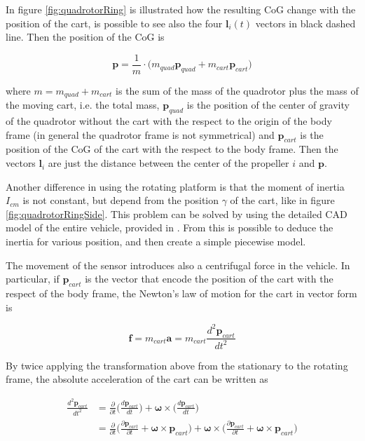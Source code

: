 \noindent In figure \ref{fig:quadrotorRing} is illustrated how the resulting CoG change with the position of the cart, is possible to see also the four $\mathbf{l}_i(t)$ vectors in black dashed line. Then the position of the CoG is

\begin{equation}
	\mathbf{p} = \frac{1}{m}\cdot \bigl(m_{quad}\mathbf{p}_{quad} + m_{cart}\mathbf{p}_{cart}\bigl)	
	\label{eq:CoG}
\end{equation}

\noindent where $m=m_{quad}+m_{cart}$ is the sum of the mass of the quadrotor plus the mass of the moving cart, i.e. the total mass, $\mathbf{p}_{quad}$ is the position of the center of gravity of the quadrotor without the cart with the respect to the origin of the body frame (in general the quadrotor frame is not symmetrical) and $\mathbf{p}_{cart}$ is the position of the CoG of the cart with the respect to the body frame. Then the vectors $\mathbf{l}_i$ are just the distance between the center of the propeller $i$ and $\mathbf{p}$.

\noindent Another difference in using the rotating platform is that the moment of inertia $I_{cm}$ is not constant, but depend from the position $\gamma$ of the cart, like in figure \ref{fig:quadrotorRingSide}. This problem can be solved by using the detailed CAD model of the entire vehicle, provided in \cite{Carlos}. From this is possible to deduce the inertia for various position, and then create a simple piecewise model. 

\noindent The movement of the sensor introduces also a centrifugal force in the vehicle. In particular, if $\mathbf{p}_{cart}$ is the vector that encode the position of the cart with the respect of the body frame, the Newton's law of motion for the cart in vector form is 

\begin{equation}
	\mathbf{f}=m_{cart}\mathbf{a}=m_{cart}\frac{d^2\mathbf{p}_{cart}}{dt^2}
	\label{eq:NewtonForce}
\end{equation}

\noindent By twice applying the transformation above from the stationary to the rotating frame, the absolute acceleration of the cart can be written as \cite{physics}

\begin{align}
	\frac{d^2\mathbf{p}_{cart}}{dt^2} &= \frac{\partial}{\partial t}\Big(\frac{d\mathbf{p}_{cart}}{dt}\Big)+\boldsymbol{\omega}\times\Big(\frac{d\mathbf{p}_{cart}}{dt}\Big) \nonumber \\
	&= \frac{\partial}{\partial t}\Big(\frac{\partial\mathbf{p}_{cart}}{\partial t}+\boldsymbol{\omega}\times\mathbf{p}_{cart}\Big)+\boldsymbol{\omega}\times\Big(\frac{\partial\mathbf{p}_{cart}}{\partial t}+\boldsymbol{\omega}\times\mathbf{p}_{cart}\Big)
	\label{eq:centrifugalAcceleration}
\end{align}

